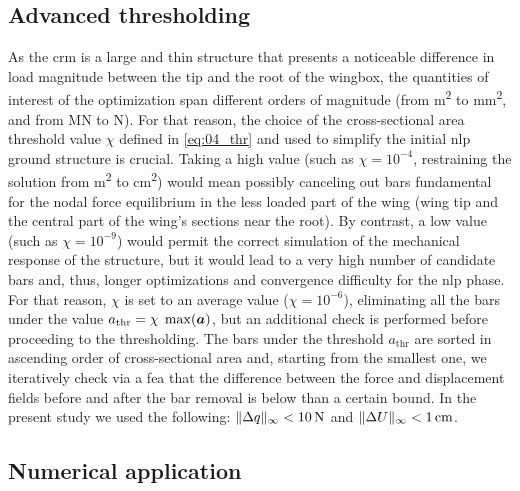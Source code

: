 \subsection{Advanced thresholding}
As the \gls{crm} is a large and thin structure that presents a noticeable difference in load magnitude between the tip and the root of the wingbox, the quantities of interest of the optimization span different orders of magnitude (from \unit{m^2} to \unit{mm^2}, and from \unit{MN} to \unit{N}). For that reason, the choice of the cross-sectional area threshold value $\chi$ defined in \eqref{eq:04_thr} and used to simplify the initial \gls{nlp} ground structure is crucial. Taking a high value (such as $\chi = 10^{-4}$, restraining the solution from \unit{m^2} to \unit{cm^2}) would mean possibly canceling out bars fundamental for the nodal force equilibrium in the less loaded part of the wing (wing tip and the central part of the wing's sections near the root). By contrast, a low value (such as $\chi=10^{-9}$) would permit the correct simulation of the mechanical response of the structure, but it would lead to a very high number of candidate bars and, thus, longer optimizations and convergence difficulty for the \gls{nlp} phase. For that reason, $\chi$ is set to an average value ($\chi=10^{-6}$), eliminating all the bars under the value $a_{\text{thr}}=\chi \; \max(\bm{a})$, but an additional check is performed before proceeding to the thresholding. The bars under the threshold $a_{\text{thr}}$ are sorted in ascending order of cross-sectional area and, starting from the smallest one, we iteratively check via a \gls{fea} that the difference between the force and displacement fields before and after the bar removal is below than a certain bound. In the present study we used the following: $\lVert\Delta q\rVert_{\infty}<\qty{10}{N}$ and $\lVert\Delta U\rVert_{\infty}<\qty{1}{cm}$.


\subsection{Numerical application}

